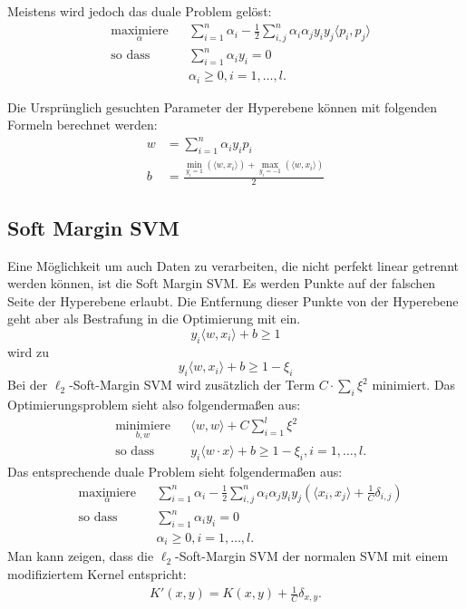 \documentclass[ngerman]{scrartcl}
\begin{document}
Meistens wird jedoch das duale Problem gelöst:
\begin{align}
&\underset{\alpha}{\text{maximiere}} && \sum_{i=1}^n \alpha_i - \frac{1}{2} \sum_{i,j}^n \alpha_i \alpha_j y_i y_j \langle p_i, p_j \rangle  \\
&\text{so dass } && \sum_{i=1}^n \alpha_i y_i = 0 \\
&&&  \alpha_i \geq 0, i = 1, \ldots  ,l.
\end{align}

Die Ursprünglich gesuchten Parameter der Hyperebene können mit folgenden Formeln berechnet werden:
\begin{align}
w &= \sum_{i=1}^n \alpha_i y_i p_i \\
b &= \frac{\min_{y_i = 1}(\langle w,x_i \rangle ) + \max_{y_i = -1}(\langle w,x_i \rangle)}{2}
\end{align}

\subsection{Soft Margin SVM}
Eine Möglichkeit um auch Daten zu verarbeiten, die nicht perfekt linear getrennt werden können, ist die Soft Margin SVM.
Es werden Punkte auf der falschen Seite der Hyperebene erlaubt.
Die Entfernung dieser Punkte von der Hyperebene geht aber als Bestrafung in die Optimierung mit ein.
\begin{equation}
y_i \langle w,x_i\rangle + b \geq 1
\end{equation}
wird zu
\begin{equation}
y_i \langle w,x_i\rangle + b \geq 1 - \xi_i
\end{equation}
Bei der $\ell_2$-Soft-Margin SVM wird zusätzlich der Term $C \cdot \sum_i \xi^2$ minimiert. Das Optimierungsproblem sieht also folgendermaßen aus:
\begin{align}
&\underset{b,w}{\text{minimiere}} &&\langle w,w \rangle + C \sum_{i=1}^l \xi^2\\
&\text{so dass } && y_i \langle w \cdot x \rangle + b \geq 1 - \xi_i , i = 1, \ldots , l. \nonumber
\end{align}
Das entsprechende duale Problem sieht folgendermaßen aus:
\begin{align}
&\underset{\alpha}{\text{maximiere}} && \sum_{i=1}^n \alpha_i - \frac{1}{2} \sum_{i,j}^n \alpha_i \alpha_j y_i y_j \left( \langle x_i, x_j \rangle + \frac{1}{C} \delta_{i,j}\right)  \\
&\text{so dass } && \sum_{i=1}^n \alpha_i y_i = 0 \\
&&&  \alpha_i \geq 0, i = 1, \ldots  ,l.
\end{align}
Man kann zeigen, dass die $\ell_2$-Soft-Margin SVM der normalen SVM mit einem modifiziertem Kernel entspricht:
\begin{align}
K'(x,y) = K(x,y) + \frac{1}{C} \delta_{x,y}.
\end{align}
\end{document}
